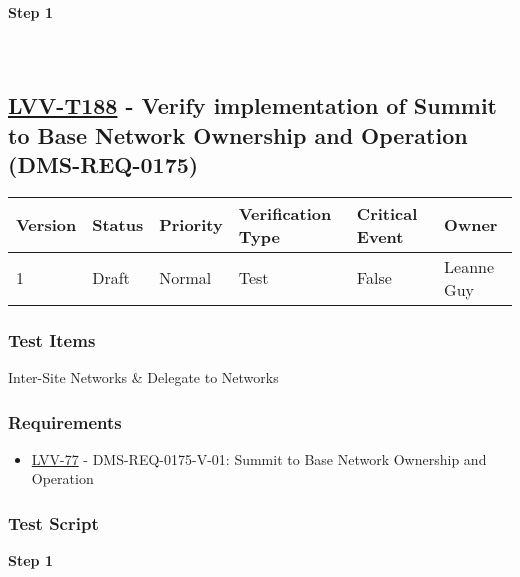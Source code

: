 \textbf{Step 1}\\
~\\
~\\

\hypertarget{lvv-t188---verify-implementation-of-summit-to-base-network-ownership-and-operation-dms-req-0175}{%
\subsection{\texorpdfstring{\href{https://jira.lsstcorp.org/secure/Tests.jspa\#/testCase/LVV-T188}{LVV-T188}
- Verify implementation of Summit to Base Network Ownership and
Operation
(DMS-REQ-0175)}{LVV-T188 - Verify implementation of Summit to Base Network Ownership and Operation (DMS-REQ-0175)}}\label{lvv-t188---verify-implementation-of-summit-to-base-network-ownership-and-operation-dms-req-0175}}

\begin{longtable}[]{@{}llllll@{}}
\toprule
Version & Status & Priority & Verification Type & Critical Event &
Owner\tabularnewline
\midrule
\endhead
1 & Draft & Normal & Test & False & Leanne Guy\tabularnewline
\bottomrule
\end{longtable}

\hypertarget{test-items-88}{%
\subsubsection{Test Items}\label{test-items-88}}

Inter-Site Networks \& Delegate to Networks

\hypertarget{requirements-88}{%
\subsubsection{Requirements}\label{requirements-88}}

\begin{itemize}
\tightlist
\item
  \href{https://jira.lsstcorp.org/browse/LVV-77}{LVV-77} -
  DMS-REQ-0175-V-01: Summit to Base Network Ownership and Operation
\end{itemize}

\hypertarget{test-script-88}{%
\subsubsection{Test Script}\label{test-script-88}}

\textbf{Step 1}\\
~\\
~\\

